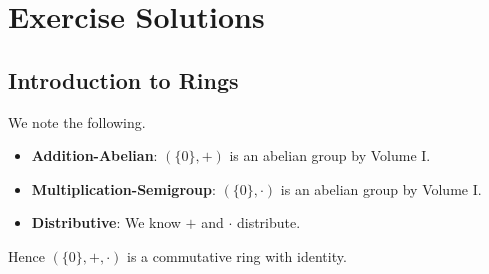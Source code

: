 \chapter{Exercise Solutions}
\section{Introduction to Rings}
\begin{questions}
    \item We note the following.
    \begin{itemize}
        \item \textbf{Addition-Abelian}: $(\{0\}, +)$ is an abelian group by Volume I.
        \item \textbf{Multiplication-Semigroup}: $(\{0\}, \cdot)$ is an abelian group by Volume I.
        \item \textbf{Distributive}: We know $+$ and $\cdot$ distribute.
    \end{itemize}
    Hence $(\{0\}, +, \cdot)$ is a commutative ring with identity.
\end{questions}

